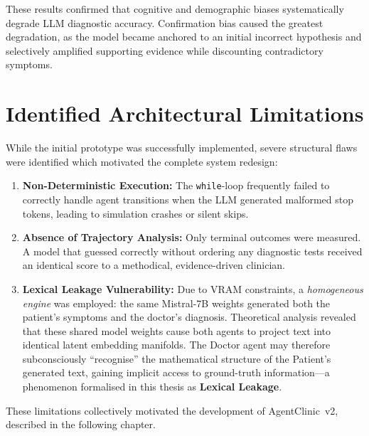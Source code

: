 These results confirmed that cognitive and demographic biases systematically degrade LLM diagnostic accuracy. Confirmation bias caused the greatest degradation, as the model became anchored to an initial incorrect hypothesis and selectively amplified supporting evidence while discounting contradictory symptoms.

\section{Identified Architectural Limitations}

While the initial prototype was successfully implemented, severe structural flaws were identified which motivated the complete system redesign:

\begin{enumerate}
    \item \textbf{Non-Deterministic Execution:} The \texttt{while}-loop frequently failed to correctly handle agent transitions when the LLM generated malformed stop tokens, leading to simulation crashes or silent skips.
    \item \textbf{Absence of Trajectory Analysis:} Only terminal outcomes were measured. A model that guessed correctly without ordering any diagnostic tests received an identical score to a methodical, evidence-driven clinician.
    \item \textbf{Lexical Leakage Vulnerability:} Due to VRAM constraints, a \textit{homogeneous engine} was employed: the same Mistral-7B weights generated both the patient's symptoms and the doctor's diagnosis. Theoretical analysis revealed that these shared model weights cause both agents to project text into identical latent embedding manifolds. The Doctor agent may therefore subconsciously ``recognise'' the mathematical structure of the Patient's generated text, gaining implicit access to ground-truth information---a phenomenon formalised in this thesis as \textbf{Lexical Leakage}.
\end{enumerate}

These limitations collectively motivated the development of AgentClinic~v2, described in the following chapter.
